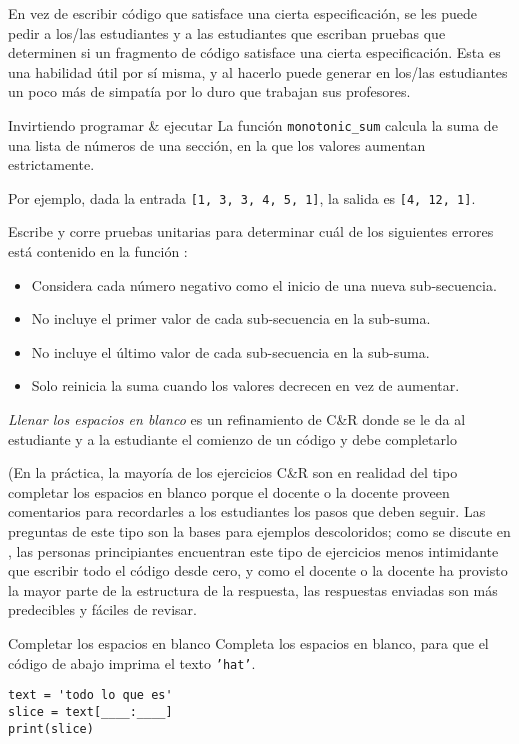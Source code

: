 En vez de escribir código que satisface una cierta especificación, 
se les puede pedir a los/las estudiantes y a las estudiantes que escriban pruebas que determinen si un fragmento de código satisface una cierta especificación. 
Esta es una habilidad útil por sí misma, y al hacerlo puede generar en los/las estudiantes un poco más de simpatía por lo duro que trabajan sus profesores.

\begin{aside}{Invirtiendo programar \& ejecutar}
 La función \texttt{monotonic\_sum} calcula la suma de una lista de números de una sección, en la que los valores aumentan estrictamente.

Por ejemplo,
  dada la entrada \texttt{[1,\ 3,\ 3,\ 4,\ 5,\ 1]},
  la salida es  \texttt{[4,\ 12,\ 1]}.

Escribe y corre pruebas unitarias para determinar cuál de los siguientes errores está contenido en la función :

   \begin{itemize}
  \item
    Considera cada número negativo como el inicio de una nueva sub-secuencia.
  \item
    No incluye el primer valor de cada sub-secuencia en la sub-suma.
  \item
    No incluye el último valor de cada sub-secuencia en la sub-suma.
  \item
    Solo reinicia la suma cuando los valores decrecen en vez de aumentar.
  \end{itemize}
\end{aside}


\emph{Llenar los espacios en blanco} es un refinamiento de C\&R
donde se le da al estudiante y a la estudiante  el comienzo de un código y debe completarlo

(En la práctica, la mayoría de los ejercicios C\&R son en realidad del tipo completar los espacios en blanco porque el docente o la  docente proveen comentarios
para recordarles a los estudiantes los pasos que deben seguir. 
Las preguntas de este tipo son la bases para  ejemplos descoloridos;
como se discute en ,
las personas principiantes encuentran este tipo de ejercicios  menos intimidante que escribir todo el código desde cero,
y como el docente o la docente ha provisto la mayor parte de la estructura de la respuesta,
las respuestas enviadas son más predecibles y fáciles de revisar.

\begin{aside}{Completar los espacios en blanco}
 Completa los espacios en blanco,
 para que el código de abajo imprima el texto  \texttt{'hat'}.

\begin{verbatim}
text = 'todo lo que es'
slice = text[____:____]
print(slice)
\end{verbatim}
\end{aside}


